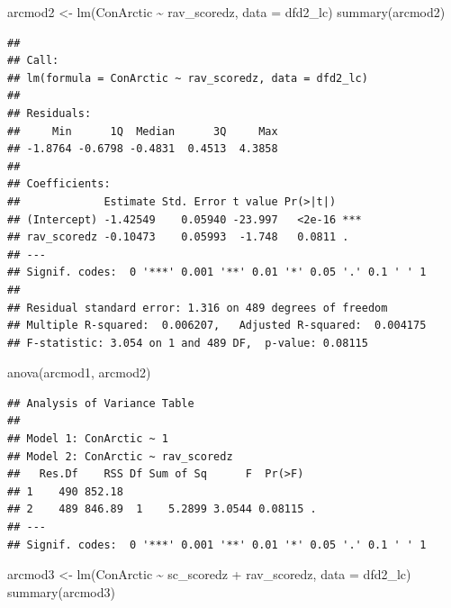 \documentclass[
]{article}
\newenvironment{Shaded}{\begin{snugshade}}{\end{snugshade}}
\newcommand{\AttributeTok}[1]{\textcolor[rgb]{0.77,0.63,0.00}{#1}}
\newcommand{\FunctionTok}[1]{\textcolor[rgb]{0.00,0.00,0.00}{#1}}
\newcommand{\NormalTok}[1]{#1}
\newcommand{\OtherTok}[1]{\textcolor[rgb]{0.56,0.35,0.01}{#1}}
\newcommand{\SpecialCharTok}[1]{\textcolor[rgb]{0.00,0.00,0.00}{#1}}
\begin{document}
\begin{Shaded}
\begin{Highlighting}[]
\NormalTok{arcmod2 }\OtherTok{\textless{}{-}} \FunctionTok{lm}\NormalTok{(ConArctic }\SpecialCharTok{\textasciitilde{}}\NormalTok{ rav\_scoredz, }\AttributeTok{data =}\NormalTok{ dfd2\_lc)}
\FunctionTok{summary}\NormalTok{(arcmod2)}
\end{Highlighting}
\end{Shaded}

\begin{verbatim}
## 
## Call:
## lm(formula = ConArctic ~ rav_scoredz, data = dfd2_lc)
## 
## Residuals:
##     Min      1Q  Median      3Q     Max 
## -1.8764 -0.6798 -0.4831  0.4513  4.3858 
## 
## Coefficients:
##             Estimate Std. Error t value Pr(>|t|)    
## (Intercept) -1.42549    0.05940 -23.997   <2e-16 ***
## rav_scoredz -0.10473    0.05993  -1.748   0.0811 .  
## ---
## Signif. codes:  0 '***' 0.001 '**' 0.01 '*' 0.05 '.' 0.1 ' ' 1
## 
## Residual standard error: 1.316 on 489 degrees of freedom
## Multiple R-squared:  0.006207,   Adjusted R-squared:  0.004175 
## F-statistic: 3.054 on 1 and 489 DF,  p-value: 0.08115
\end{verbatim}

\begin{Shaded}
\begin{Highlighting}[]
\FunctionTok{anova}\NormalTok{(arcmod1, arcmod2)}
\end{Highlighting}
\end{Shaded}

\begin{verbatim}
## Analysis of Variance Table
## 
## Model 1: ConArctic ~ 1
## Model 2: ConArctic ~ rav_scoredz
##   Res.Df    RSS Df Sum of Sq      F  Pr(>F)  
## 1    490 852.18                              
## 2    489 846.89  1    5.2899 3.0544 0.08115 .
## ---
## Signif. codes:  0 '***' 0.001 '**' 0.01 '*' 0.05 '.' 0.1 ' ' 1
\end{verbatim}

\begin{Shaded}
\begin{Highlighting}[]
\NormalTok{arcmod3 }\OtherTok{\textless{}{-}} \FunctionTok{lm}\NormalTok{(ConArctic }\SpecialCharTok{\textasciitilde{}}\NormalTok{ sc\_scoredz }\SpecialCharTok{+}\NormalTok{ rav\_scoredz, }\AttributeTok{data =}\NormalTok{ dfd2\_lc)}
\FunctionTok{summary}\NormalTok{(arcmod3)}
\end{Highlighting}
\end{Shaded}
\end{document}
